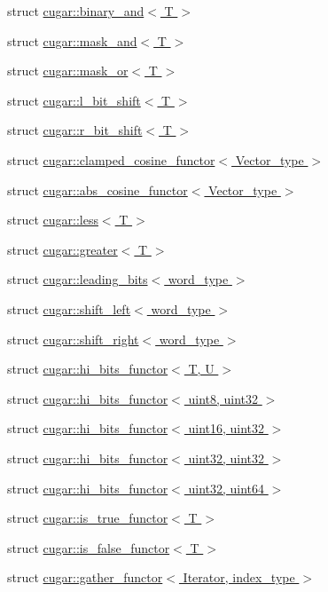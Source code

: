 \begin{DoxyCompactItemize}
\item 
struct \hyperlink{structcugar_1_1binary__and}{cugar\+::binary\+\_\+and$<$ T $>$}
\item 
struct \hyperlink{structcugar_1_1mask__and}{cugar\+::mask\+\_\+and$<$ T $>$}
\item 
struct \hyperlink{structcugar_1_1mask__or}{cugar\+::mask\+\_\+or$<$ T $>$}
\item 
struct \hyperlink{structcugar_1_1l__bit__shift}{cugar\+::l\+\_\+bit\+\_\+shift$<$ T $>$}
\item 
struct \hyperlink{structcugar_1_1r__bit__shift}{cugar\+::r\+\_\+bit\+\_\+shift$<$ T $>$}
\item 
struct \hyperlink{structcugar_1_1clamped__cosine__functor}{cugar\+::clamped\+\_\+cosine\+\_\+functor$<$ Vector\+\_\+type $>$}
\item 
struct \hyperlink{structcugar_1_1abs__cosine__functor}{cugar\+::abs\+\_\+cosine\+\_\+functor$<$ Vector\+\_\+type $>$}
\item 
struct \hyperlink{structcugar_1_1less}{cugar\+::less$<$ T $>$}
\item 
struct \hyperlink{structcugar_1_1greater}{cugar\+::greater$<$ T $>$}
\item 
struct \hyperlink{structcugar_1_1leading__bits}{cugar\+::leading\+\_\+bits$<$ word\+\_\+type $>$}
\item 
struct \hyperlink{structcugar_1_1shift__left}{cugar\+::shift\+\_\+left$<$ word\+\_\+type $>$}
\item 
struct \hyperlink{structcugar_1_1shift__right}{cugar\+::shift\+\_\+right$<$ word\+\_\+type $>$}
\item 
struct \hyperlink{structcugar_1_1hi__bits__functor}{cugar\+::hi\+\_\+bits\+\_\+functor$<$ T, U $>$}
\item 
struct \hyperlink{structcugar_1_1hi__bits__functor_3_01uint8_00_01uint32_01_4}{cugar\+::hi\+\_\+bits\+\_\+functor$<$ uint8, uint32 $>$}
\item 
struct \hyperlink{structcugar_1_1hi__bits__functor_3_01uint16_00_01uint32_01_4}{cugar\+::hi\+\_\+bits\+\_\+functor$<$ uint16, uint32 $>$}
\item 
struct \hyperlink{structcugar_1_1hi__bits__functor_3_01uint32_00_01uint32_01_4}{cugar\+::hi\+\_\+bits\+\_\+functor$<$ uint32, uint32 $>$}
\item 
struct \hyperlink{structcugar_1_1hi__bits__functor_3_01uint32_00_01uint64_01_4}{cugar\+::hi\+\_\+bits\+\_\+functor$<$ uint32, uint64 $>$}
\item 
struct \hyperlink{structcugar_1_1is__true__functor}{cugar\+::is\+\_\+true\+\_\+functor$<$ T $>$}
\item 
struct \hyperlink{structcugar_1_1is__false__functor}{cugar\+::is\+\_\+false\+\_\+functor$<$ T $>$}
\item 
struct \hyperlink{structcugar_1_1gather__functor}{cugar\+::gather\+\_\+functor$<$ Iterator, index\+\_\+type $>$}
\end{DoxyCompactItemize}
